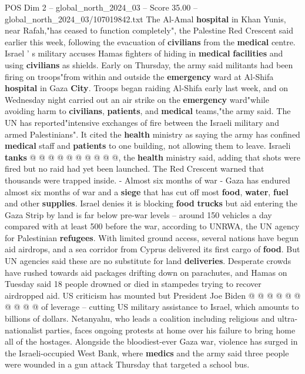 \begin{textsample}{POS Dim 2 – global\_north\_2024\_03 – Score 35.00 – global\_north\_2024\_03/107019842.txt}
The Al-Amal \textbf{hospital} in Khan Yunis, near Rafah,"has ceased to function completely", the Palestine Red Crescent said earlier this week, following the evacuation of \textbf{civilians} from the \textbf{medical} centre.
Israel ' s military accuses Hamas fighters of hiding in \textbf{medical} \textbf{facilities} and using \textbf{civilians} as shields.
Early on Thursday, the army said militants had been firing on troops"from within and outside the \textbf{emergency} ward at Al-Shifa \textbf{hospital} in Gaza \textbf{City}.
Troops began raiding Al-Shifa early last week, and on Wednesday night carried out an air strike on the \textbf{emergency} ward"while avoiding harm to \textbf{civilians}, \textbf{patients}, and \textbf{medical} teams,"the army said.
The UN has reported"intensive exchanges of fire between the Israeli military and armed Palestinians".
It cited the \textbf{health} ministry as saying the army has confined \textbf{medical} staff and \textbf{patients} to one building, not allowing them to leave.
Israeli \textbf{tanks} @ @ @ @ @ @ @ @ @ @, the \textbf{health} ministry said, adding that shots were fired but no raid had yet been launched.
The Red Crescent warned that thousands were trapped inside. - Almost six months of war - Gaza has endured almost six months of war and a \textbf{siege} that has cut off most \textbf{food}, \textbf{water}, \textbf{fuel} and other \textbf{supplies}.
Israel denies it is blocking \textbf{food} \textbf{trucks} but aid entering the Gaza Strip by land is far below pre-war levels -- around 150 vehicles a day compared with at least 500 before the war, according to UNRWA, the UN agency for Palestinian \textbf{refugees}.
With limited ground access, several nations have begun aid airdrops, and a sea corridor from Cyprus delivered its first cargo of \textbf{food}.
But UN agencies said these are no substitute for land \textbf{deliveries}.
Desperate crowds have rushed towards aid packages drifting down on parachutes, and Hamas on Tuesday said 18 people drowned or died in stampedes trying to recover airdropped aid.
US criticism has mounted but President Joe Biden @ @ @ @ @ @ @ @ @ @ of leverage -- cutting US military assistance to Israel, which amounts to billions of dollars.
Netanyahu, who leads a coalition including religious and ultra-nationalist parties, faces ongoing protests at home over his failure to bring home all of the hostages.
Alongside the bloodiest-ever Gaza war, violence has surged in the Israeli-occupied West Bank, where \textbf{medics} and the army said three people were wounded in a gun attack Thursday that targeted a school bus.

\end{textsample}

